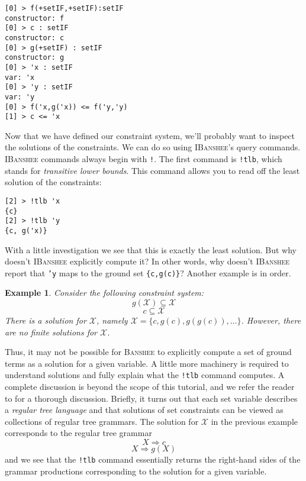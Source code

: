 \documentclass{article}
\newcommand{\banshee}{\textsc{Banshee}}
\newcommand{\ibanshee}{\textsc{IBanshee}}
\newcommand{\var}[1]{\mathcal{#1}}
\newtheorem{example}{Example}
\begin{document}
\begin{verbatim}
[0] > f(+setIF,+setIF):setIF
constructor: f
[0] > c : setIF
constructor: c
[0] > g(+setIF) : setIF
constructor: g
[0] > 'x : setIF
var: 'x
[0] > 'y : setIF
var: 'y
[0] > f('x,g('x)) <= f('y,'y)
[1] > c <= 'x
\end{verbatim}

Now that we have defined our constraint system, we'll probably want to
inspect the solutions of the constraints. We can do so using
\ibanshee{}'s query commands. \ibanshee{} commands always begin with
\texttt{!}. The first command is \texttt{!tlb}, which stands for
\emph{transitive lower bounds}. This command allows you to read off
the least solution of the constraints:

\begin{verbatim}
[2] > !tlb 'x
{c}
[2] > !tlb 'y
{c, g('x)}
\end{verbatim}

With a little investigation we see that this is exactly the least
solution. But why doesn't \ibanshee{} explicitly compute it? In other
words, why doesn't \ibanshee{} report that \texttt{'y} maps to the
ground set \texttt{\{c,g(c)\}}? Another example is in order. 

\begin{example}
Consider the following constraint system: 
\[
g(\var{X}) \subseteq \var{X}
\]
\[
c \subseteq \var{X}
\]
There is a solution for $\var{X}$, namely $\var{X} = \{c, g(c),
g(g(c)),\ldots\}$. However, there are no finite solutions for
$\var{X}$.
\end{example}

Thus, it may not be possible for \banshee{} to explicitly compute a
set of ground terms as a solution for a given variable. A little more
machinery is required to understand solutions and fully explain what
the \texttt{!tlb} command computes. A complete discussion is beyond
the scope of this tutorial, and we refer the reader to
\cite{heintze:thesis} for a thorough discussion. Briefly, it turns out
that each set variable describes a \emph{regular tree language} and
that solutions of set constraints can be viewed as collections of
regular tree grammars. The solution for $\var{X}$ in the previous
example corresponds to the regular tree grammar
\[
X \Rightarrow c
\]
\[
X \Rightarrow g(X)
\]
and we see that the \texttt{!tlb} command essentially returns the
right-hand sides of the grammar productions corresponding to the
solution for a given variable.
\end{document}
